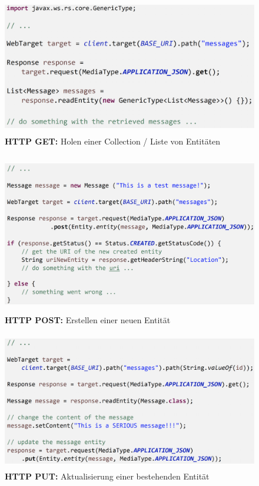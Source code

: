 \documentclass[a4paper]{article}
\begin{document}
				\newpage
			
				\begin{figure}[!htb]
					\centering
					\includegraphics[keepaspectratio, height=6cm]{img/ws/jersey_02.png}
					\caption{\textbf{HTTP GET:} Holen einer Collection / Liste von Entitäten}
					\label{fig:jersey_httpget2}
				\end{figure}
			
				\begin{figure}[!htb]
					\centering
					\includegraphics[keepaspectratio, height=7cm]{img/ws/jersey_03.png}
					\caption{\textbf{HTTP POST:} Erstellen einer neuen Entität}
					\label{fig:jersey_httppost}
				\end{figure}
			
				\begin{figure}[!htb]
					\centering
					\includegraphics[keepaspectratio, height=6cm]{img/ws/jersey_04.png}
					\caption{\textbf{HTTP PUT:} Aktualisierung einer bestehenden Entität}
					\label{fig:jersey_httpput}
				\end{figure}
			
\end{document}
